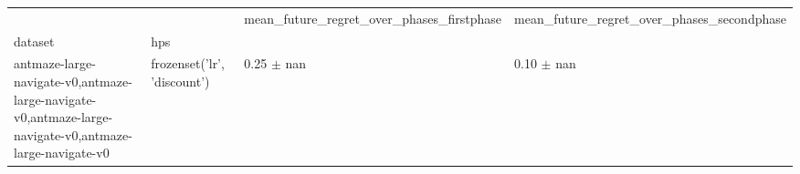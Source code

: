\begin{tabular}{llll}
\toprule
 &  & mean_future_regret_over_phases_firstphase & mean_future_regret_over_phases_secondphase \\
dataset & hps &  &  \\
\midrule
antmaze-large-navigate-v0,antmaze-large-navigate-v0,antmaze-large-navigate-v0,antmaze-large-navigate-v0 & frozenset({'lr', 'discount'}) & 0.25 $\pm$ nan & 0.10 $\pm$ nan \\
\cline{1-4}
\bottomrule
\end{tabular}
